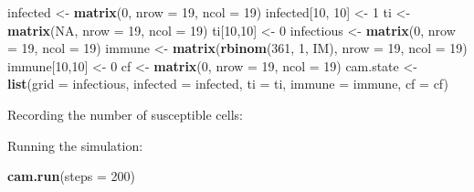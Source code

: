 \documentclass[12pt,a4paper]{book}
\newenvironment{Shaded}{\begin{snugshade}}{\end{snugshade}}
\newcommand{\DataTypeTok}[1]{\textcolor[rgb]{0.13,0.29,0.53}{#1}}
\newcommand{\DecValTok}[1]{\textcolor[rgb]{0.00,0.00,0.81}{#1}}
\newcommand{\KeywordTok}[1]{\textcolor[rgb]{0.13,0.29,0.53}{\textbf{#1}}}
\newcommand{\NormalTok}[1]{#1}
\newcommand{\OperatorTok}[1]{\textcolor[rgb]{0.81,0.36,0.00}{\textbf{#1}}}
\newcommand{\OtherTok}[1]{\textcolor[rgb]{0.56,0.35,0.01}{#1}}
\newcommand{\StringTok}[1]{\textcolor[rgb]{0.31,0.60,0.02}{#1}}
\theoremstyle{definition}
\theoremstyle{definition}
\theoremstyle{definition}
\theoremstyle{remark}
\begin{document}
\begin{Shaded}
\begin{Highlighting}[]
\NormalTok{infected <-}\StringTok{ }\KeywordTok{matrix}\NormalTok{(}\DecValTok{0}\NormalTok{, }\DataTypeTok{nrow =} \DecValTok{19}\NormalTok{, }\DataTypeTok{ncol =} \DecValTok{19}\NormalTok{)}
\NormalTok{infected[}\DecValTok{10}\NormalTok{, }\DecValTok{10}\NormalTok{] <-}\StringTok{ }\DecValTok{1}
\NormalTok{ti <-}\StringTok{ }\KeywordTok{matrix}\NormalTok{(}\OtherTok{NA}\NormalTok{, }\DataTypeTok{nrow =} \DecValTok{19}\NormalTok{, }\DataTypeTok{ncol =} \DecValTok{19}\NormalTok{)}
\NormalTok{ti[}\DecValTok{10}\NormalTok{,}\DecValTok{10}\NormalTok{] <-}\StringTok{ }\DecValTok{0}
\NormalTok{infectious <-}\StringTok{ }\KeywordTok{matrix}\NormalTok{(}\DecValTok{0}\NormalTok{, }\DataTypeTok{nrow =} \DecValTok{19}\NormalTok{, }\DataTypeTok{ncol =} \DecValTok{19}\NormalTok{)}
\NormalTok{immune <-}\StringTok{ }\KeywordTok{matrix}\NormalTok{(}\KeywordTok{rbinom}\NormalTok{(}\DecValTok{361}\NormalTok{, }\DecValTok{1}\NormalTok{, IM), }\DataTypeTok{nrow =} \DecValTok{19}\NormalTok{, }\DataTypeTok{ncol =} \DecValTok{19}\NormalTok{)}
\NormalTok{immune[}\DecValTok{10}\NormalTok{,}\DecValTok{10}\NormalTok{] <-}\StringTok{ }\DecValTok{0}
\NormalTok{cf <-}\StringTok{ }\KeywordTok{matrix}\NormalTok{(}\DecValTok{0}\NormalTok{, }\DataTypeTok{nrow =} \DecValTok{19}\NormalTok{, }\DataTypeTok{ncol =} \DecValTok{19}\NormalTok{)}
\NormalTok{cam.state <-}\StringTok{ }\KeywordTok{list}\NormalTok{(}\DataTypeTok{grid =}\NormalTok{ infectious, }\DataTypeTok{infected =}\NormalTok{ infected, }\DataTypeTok{ti =}\NormalTok{ ti,}
                  \DataTypeTok{immune =}\NormalTok{ immune, }\DataTypeTok{cf =}\NormalTok{ cf)}
\end{Highlighting}
\end{Shaded}

Recording the number of susceptible cells:

\begin{Shaded}
\end{Shaded}

Running the simulation:

\begin{Shaded}
\begin{Highlighting}[]
\KeywordTok{cam.run}\NormalTok{(}\DataTypeTok{steps =} \DecValTok{200}\NormalTok{)}
\end{Highlighting}
\end{Shaded}
\end{document}
